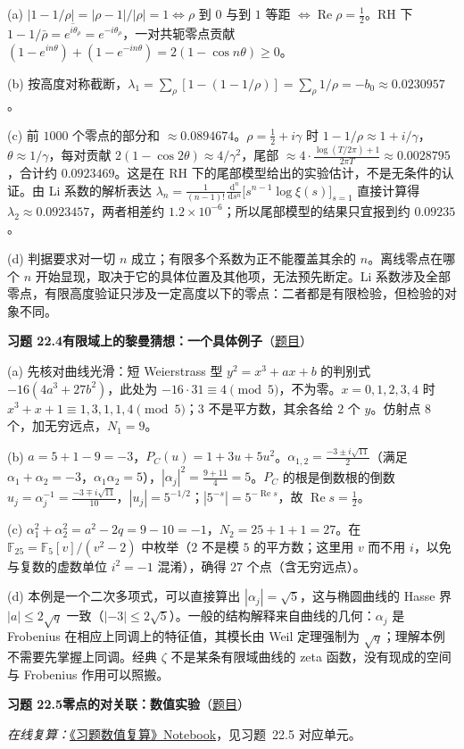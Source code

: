 \documentclass[11pt,a4paper]{article}
\newcommand{\dd}{\,\mathrm{d}}
\renewcommand{\Re}{\operatorname{Re}}
\newcommand{\Sol}[2]{%
  \par\addvspace{1.2em}\noindent
  \hypertarget{s:#1}{}\textbf{习题 #1\quad #2}\hfill{\small（\hyperlink{q:#1}{题目}）}\par
  \nopagebreak\smallskip}
\begin{document}
(a) $|1-1/\rho|=|\rho-1|/|\rho|=1\iff\rho$ 到 $0$ 与到 $1$ 等距 $\iff\Re\rho=\frac12$。RH 下 $1-1/\bar\rho=\overline{e^{i\theta_\rho}}=e^{-i\theta_\rho}$，一对共轭零点贡献 $(1-e^{in\theta})+(1-e^{-in\theta})=2(1-\cos n\theta)\ge0$。

(b) 按高度对称截断，$\lambda_1=\sum_\rho[1-(1-1/\rho)]=\sum_\rho1/\rho=-b_0\approx0.0230957$。

(c) 前 $1000$ 个零点的部分和 $\approx0.0894674$。$\rho=\frac12+i\gamma$ 时 $1-1/\rho\approx1+i/\gamma$，$\theta\approx1/\gamma$，每对贡献 $2(1-\cos2\theta)\approx4/\gamma^2$，尾部 $\approx4\cdot\frac{\log(T/2\pi)+1}{2\pi T}\approx0.0028795$，合计约 $0.0923469$。这是在 RH 下的尾部模型给出的实验估计，不是无条件的认证。由 Li 系数的解析表达 $\lambda_n=\frac1{(n-1)!}\frac{\dd^n}{\dd s^n}\bigl[s^{n-1}\log\xi(s)\bigr]_{s=1}$ 直接计算得 $\lambda_2\approx0.0923457$，两者相差约 $1.2\times10^{-6}$；所以尾部模型的结果只宜报到约 $0.09235$。

(d) 判据要求对一切 $n$ 成立；有限多个系数为正不能覆盖其余的 $n$。离线零点在哪个 $n$ 开始显现，取决于它的具体位置及其他项，无法预先断定。Li 系数涉及全部零点，有限高度验证只涉及一定高度以下的零点：二者都是有限检验，但检验的对象不同。

\Sol{22.4}{有限域上的黎曼猜想：一个具体例子}
(a) 先核对曲线光滑：短 Weierstrass 型 $y^2=x^3+ax+b$ 的判别式 $-16(4a^3+27b^2)$，此处为 $-16\cdot31\equiv4\pmod5$，不为零。$x=0,1,2,3,4$ 时 $x^3+x+1\equiv1,3,1,1,4\pmod5$；$3$ 不是平方数，其余各给 $2$ 个 $y$。仿射点 $8$ 个，加无穷远点，$N_1=9$。

(b) $a=5+1-9=-3$，$P_C(u)=1+3u+5u^2$。$\alpha_{1,2}=\frac{-3\pm i\sqrt{11}}2$（满足 $\alpha_1+\alpha_2=-3$，$\alpha_1\alpha_2=5$），$|\alpha_j|^2=\frac{9+11}4=5$。$P_C$ 的根是倒数根的倒数 $u_j=\alpha_j^{-1}=\frac{-3\mp i\sqrt{11}}{10}$，$|u_j|=5^{-1/2}$；$|5^{-s}|=5^{-\Re s}$，故 $\Re s=\frac12$。

(c) $\alpha_1^2+\alpha_2^2=a^2-2q=9-10=-1$，$N_2=25+1+1=27$。在 $\mathbb F_{25}=\mathbb F_5[v]/(v^2-2)$ 中枚举（$2$ 不是模 $5$ 的平方数；这里用 $v$ 而不用 $i$，以免与复数的虚数单位 $i^2=-1$ 混淆），确得 $27$ 个点（含无穷远点）。

(d) 本例是一个二次多项式，可以直接算出 $|\alpha_j|=\sqrt5$，这与椭圆曲线的 Hasse 界 $|a|\le2\sqrt q$ 一致（$|{-3}|\le2\sqrt5$）。一般的结构解释来自曲线的几何：$\alpha_j$ 是 Frobenius 在相应上同调上的特征值，其模长由 Weil 定理强制为 $\sqrt q$；理解本例不需要先掌握上同调。经典 $\zeta$ 不是某条有限域曲线的 zeta 函数，没有现成的空间与 Frobenius 作用可以照搬。

\Sol{22.5}{零点的对关联：数值实验}
\emph{在线复算：}\href{https://colab.research.google.com/github/lichengtong123/lichengtong-RH/blob/main/\%E4\%B9\%A0\%E9\%A2\%98\%E4\%B8\%8E\%E8\%A7\%A3\%E7\%AD\%94/\%E4\%B9\%A0\%E9\%A2\%98\%E6\%95\%B0\%E5\%80\%BC\%E5\%A4\%8D\%E7\%AE\%97.ipynb}{《习题数值复算》Notebook}，见习题~22.5 对应单元。
\end{document}
